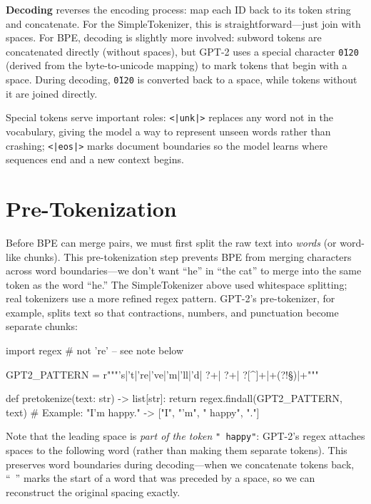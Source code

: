 \begin{keyconcept}
  \textbf{Decoding} reverses the encoding process: map each ID back to its
  token string and concatenate. For the SimpleTokenizer, this is
  straightforward---just join with spaces. For BPE, decoding is slightly
  more involved: subword tokens are concatenated directly (without spaces),
  but GPT-2 uses a special character \texttt{\u0120} (derived from the
  byte-to-unicode mapping) to mark tokens that begin with a space. During
  decoding, \texttt{\u0120} is converted back to a space, while tokens
  without it are joined directly.

  Special tokens serve important roles:
  \texttt{<|unk|>} replaces any word not in the vocabulary, giving the model
  a way to represent unseen words rather than crashing;
  \texttt{<|eos|>} marks document boundaries so the model learns where
  sequences end and a new context begins.
\end{keyconcept}

\section{Pre-Tokenization\label{sec:pretok}}

Before BPE can merge pairs, we must first split the raw text into
\emph{words} (or word-like chunks). This pre-tokenization step prevents
BPE from merging characters across word boundaries---we don't want ``he''
in ``the cat'' to merge into the same token as the word ``he.''  The
SimpleTokenizer above used whitespace splitting; real tokenizers use a
more refined regex pattern. GPT-2's pre-tokenizer, for example, splits
text so that contractions, numbers, and punctuation become separate
chunks:

\begin{pseudocode}
import regex                           # not 're' -- see note below

GPT2_PATTERN = r"""'s|'t|'re|'ve|'m|'ll|'d| ?+| ?+| ?[^\s{}]+|\s+(?!\S)|\s+"""

def pretokenize(text: str) -> list[str]:
    return regex.findall(GPT2_PATTERN, text)
# Example: "I'm happy." -> ["I", "'m", " happy", "."]
\end{pseudocode}

\noindent Note that the leading space is \emph{part of the token}
\texttt{"~happy"}: GPT-2's regex attaches spaces to the following word
(rather than making them separate tokens). This preserves word boundaries
during decoding---when we concatenate tokens back, ``~'' marks the start
of a word that was preceded by a space, so we can reconstruct the original
spacing exactly.

